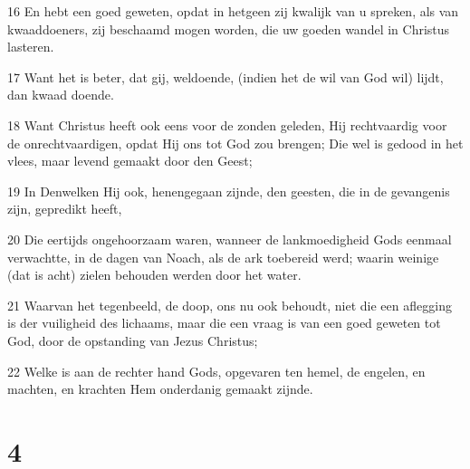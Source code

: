 \par 16 En hebt een goed geweten, opdat in hetgeen zij kwalijk van u spreken, als van kwaaddoeners, zij beschaamd mogen worden, die uw goeden wandel in Christus lasteren.
\par 17 Want het is beter, dat gij, weldoende, (indien het de wil van God wil) lijdt, dan kwaad doende.
\par 18 Want Christus heeft ook eens voor de zonden geleden, Hij rechtvaardig voor de onrechtvaardigen, opdat Hij ons tot God zou brengen; Die wel is gedood in het vlees, maar levend gemaakt door den Geest;
\par 19 In Denwelken Hij ook, henengegaan zijnde, den geesten, die in de gevangenis zijn, gepredikt heeft,
\par 20 Die eertijds ongehoorzaam waren, wanneer de lankmoedigheid Gods eenmaal verwachtte, in de dagen van Noach, als de ark toebereid werd; waarin weinige (dat is acht) zielen behouden werden door het water.
\par 21 Waarvan het tegenbeeld, de doop, ons nu ook behoudt, niet die een aflegging is der vuiligheid des lichaams, maar die een vraag is van een goed geweten tot God, door de opstanding van Jezus Christus;
\par 22 Welke is aan de rechter hand Gods, opgevaren ten hemel, de engelen, en machten, en krachten Hem onderdanig gemaakt zijnde.

\chapter{4}

